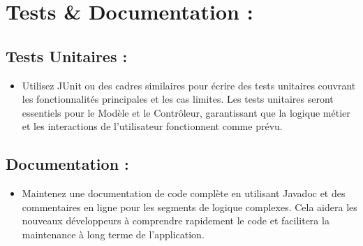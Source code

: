 \documentclass{article}
\begin{document}
\section{Tests \& Documentation :}
\subsection{Tests Unitaires :}
\begin{itemize}
  \item Utilisez JUnit ou des cadres similaires pour écrire des tests unitaires couvrant les fonctionnalités principales et les cas limites. Les tests unitaires seront essentiels pour le Modèle et le Contrôleur, garantissant que la logique métier et les interactions de l'utilisateur fonctionnent comme prévu.
\end{itemize}
\subsection{Documentation :}
\begin{itemize}
  \item Maintenez une documentation de code complète en utilisant Javadoc et des commentaires en ligne pour les segments de logique complexes. Cela aidera les nouveaux développeurs à comprendre rapidement le code et facilitera la maintenance à long terme de l'application.
\end{itemize}
\end{document}
